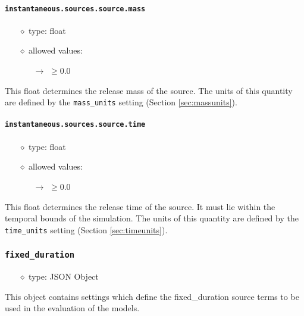 \documentclass[]{article}
\def\code#1{\texttt{#1}}
\begin{document}
\paragraph{\code{instantaneous.sources.source.mass}}\label{sec:instsourcemass}
\begin{itemize}
    \item[$\diamond$] type: float 
    \item[$\diamond$] allowed values:
    \begin{itemize}
        \item[$\rightarrow$] $\geq0.0$
    \end{itemize}
\end{itemize}
This float determines the release mass of the source. The units of this quantity
are defined by the \code{mass\_units} setting (Section
\ref{sec:massunits}).

\paragraph{\code{instantaneous.sources.source.time}}\label{sec:instsourcetime}
\begin{itemize}
    \item[$\diamond$] type: float 
    \item[$\diamond$] allowed values:
    \begin{itemize}
        \item[$\rightarrow$] $\geq0.0$
    \end{itemize}
\end{itemize}
This float determines the release time of the source. It must lie within the
temporal bounds of the simulation. The units of this quantity are defined by the
\code{time\_units} setting (Section \ref{sec:timeunits}).

\subsubsection{\code{fixed\_duration}}
\begin{itemize}
    \item[$\diamond$] type: JSON Object 
\end{itemize}
This object contains settings which define the fixed\_duration source terms to be
used in the evaluation of the models.
\end{document}
